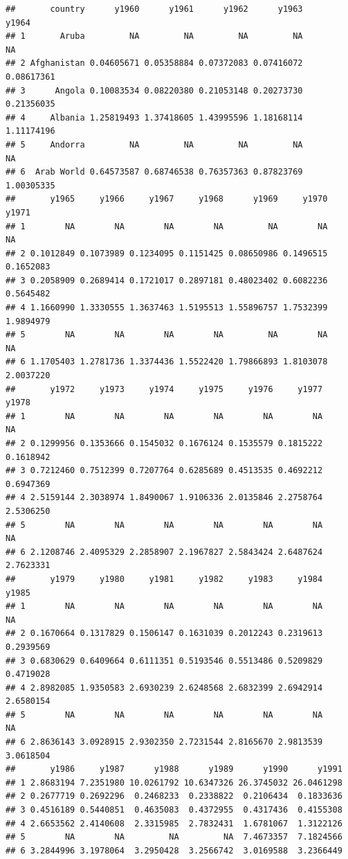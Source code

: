 \documentclass[]{book}
\begin{document}
\begin{verbatim}
##       country      y1960      y1961      y1962      y1963      y1964
## 1       Aruba         NA         NA         NA         NA         NA
## 2 Afghanistan 0.04605671 0.05358884 0.07372083 0.07416072 0.08617361
## 3      Angola 0.10083534 0.08220380 0.21053148 0.20273730 0.21356035
## 4     Albania 1.25819493 1.37418605 1.43995596 1.18168114 1.11174196
## 5     Andorra         NA         NA         NA         NA         NA
## 6  Arab World 0.64573587 0.68746538 0.76357363 0.87823769 1.00305335
##       y1965     y1966     y1967     y1968      y1969     y1970     y1971
## 1        NA        NA        NA        NA         NA        NA        NA
## 2 0.1012849 0.1073989 0.1234095 0.1151425 0.08650986 0.1496515 0.1652083
## 3 0.2058909 0.2689414 0.1721017 0.2897181 0.48023402 0.6082236 0.5645482
## 4 1.1660990 1.3330555 1.3637463 1.5195513 1.55896757 1.7532399 1.9894979
## 5        NA        NA        NA        NA         NA        NA        NA
## 6 1.1705403 1.2781736 1.3374436 1.5522420 1.79866893 1.8103078 2.0037220
##       y1972     y1973     y1974     y1975     y1976     y1977     y1978
## 1        NA        NA        NA        NA        NA        NA        NA
## 2 0.1299956 0.1353666 0.1545032 0.1676124 0.1535579 0.1815222 0.1618942
## 3 0.7212460 0.7512399 0.7207764 0.6285689 0.4513535 0.4692212 0.6947369
## 4 2.5159144 2.3038974 1.8490067 1.9106336 2.0135846 2.2758764 2.5306250
## 5        NA        NA        NA        NA        NA        NA        NA
## 6 2.1208746 2.4095329 2.2858907 2.1967827 2.5843424 2.6487624 2.7623331
##       y1979     y1980     y1981     y1982     y1983     y1984     y1985
## 1        NA        NA        NA        NA        NA        NA        NA
## 2 0.1670664 0.1317829 0.1506147 0.1631039 0.2012243 0.2319613 0.2939569
## 3 0.6830629 0.6409664 0.6111351 0.5193546 0.5513486 0.5209829 0.4719028
## 4 2.8982085 1.9350583 2.6930239 2.6248568 2.6832399 2.6942914 2.6580154
## 5        NA        NA        NA        NA        NA        NA        NA
## 6 2.8636143 3.0928915 2.9302350 2.7231544 2.8165670 2.9813539 3.0618504
##       y1986     y1987      y1988      y1989      y1990      y1991
## 1 2.8683194 7.2351980 10.0261792 10.6347326 26.3745032 26.0461298
## 2 0.2677719 0.2692296  0.2468233  0.2338822  0.2106434  0.1833636
## 3 0.4516189 0.5440851  0.4635083  0.4372955  0.4317436  0.4155308
## 4 2.6653562 2.4140608  2.3315985  2.7832431  1.6781067  1.3122126
## 5        NA        NA         NA         NA  7.4673357  7.1824566
## 6 3.2844996 3.1978064  3.2950428  3.2566742  3.0169588  3.2366449

\end{verbatim}
\end{document}
